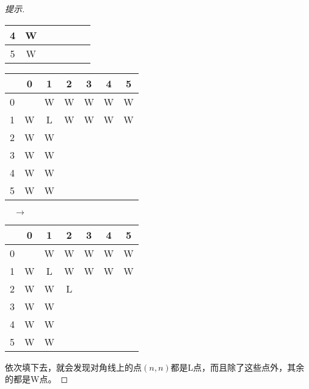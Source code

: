 \begin{proof}[提示]
\begin{center}
\begin{tabular}{|c|c|c|c|c|c|c|}
      4 & W &   &   &   &   &  \\\hline
      5 & W &   &   &   &   &  \\\hline
    \end{tabular}
  \end{center}
  \begin{center}
    \begin{tabular}{|c|c|c|c|c|c|c|}
      \hline
        & 0 & 1 & 2 & 3 & 4 & 5\\\hline
      0 &   & W & W & W & W & W\\\hline
      1 & W & L & \cellcolor{blue!20}W & \cellcolor{blue!20}W & \cellcolor{blue!20}W & \cellcolor{blue!20}W\\\hline
      2 & W & \cellcolor{blue!20}W &   &   &   &  \\\hline
      3 & W & \cellcolor{blue!20}W &   &   &   &  \\\hline
      4 & W & \cellcolor{blue!20}W &   &   &   &  \\\hline
      5 & W & \cellcolor{blue!20}W &   &   &   &  \\\hline
    \end{tabular}
    $\quad\to\quad$
    \begin{tabular}{|c|c|c|c|c|c|c|}
      \hline
        & 0 & 1 & 2 & 3 & 4 & 5\\\hline
      0 &   & W & W & W & W & W\\\hline
      1 & W & L & W & W & W & W\\\hline
      2 & W & W & \cellcolor{blue!20}L  &   &   &  \\\hline
      3 & W & W &   &   &   &  \\\hline
      4 & W & W &   &   &   &  \\\hline
      5 & W & W &   &   &   &  \\\hline
    \end{tabular}
  \end{center}
依次填下去，就会发现对角线上的点$(n,n)$都是L点，而且除了这些点外，其余的都是W点。
\end{proof}

